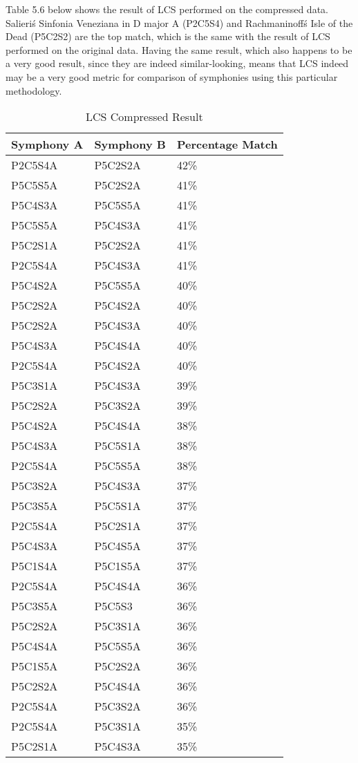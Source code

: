 Table 5.6 below shows the result of LCS performed on the compressed data.  Salieri\'s Sinfonia Veneziana in D major A (P2C5S4) and Rachmaninoff\'s Isle of the Dead (P5C2S2) are the top match, which is the same with the result of LCS performed on the original data. Having the same result, which also happens to be a very good result, since they are indeed similar-looking, means that LCS indeed may be a very good metric for comparison of symphonies using this particular methodology.

\begin{longtable}{|l|l|l|}
\caption{LCS  Compressed Result}
\label{my-label}\\
\hline
Symphony A & Symphony B & Percentage Match \\ \hline
\endfirsthead
%
\endhead
%
P2C5S4A & P5C2S2A & 42\% \\ \hline
P5C5S5A & P5C2S2A & 41\% \\ \hline
P5C4S3A & P5C5S5A & 41\% \\ \hline
P5C5S5A & P5C4S3A & 41\% \\ \hline
P5C2S1A & P5C2S2A & 41\% \\ \hline
P2C5S4A & P5C4S3A & 41\% \\ \hline
P5C4S2A & P5C5S5A & 40\% \\ \hline
P5C2S2A & P5C4S2A & 40\% \\ \hline
P5C2S2A & P5C4S3A & 40\% \\ \hline
P5C4S3A & P5C4S4A & 40\% \\ \hline
P2C5S4A & P5C4S2A & 40\% \\ \hline
P5C3S1A & P5C4S3A & 39\% \\ \hline
P5C2S2A & P5C3S2A & 39\% \\ \hline
P5C4S2A & P5C4S4A & 38\% \\ \hline
P5C4S3A & P5C5S1A & 38\% \\ \hline
P2C5S4A & P5C5S5A & 38\% \\ \hline
P5C3S2A & P5C4S3A & 37\% \\ \hline
P5C3S5A & P5C5S1A & 37\% \\ \hline
P2C5S4A & P5C2S1A & 37\% \\ \hline
P5C4S3A & P5C4S5A & 37\% \\ \hline
P5C1S4A & P5C1S5A & 37\% \\ \hline
P2C5S4A & P5C4S4A & 36\% \\ \hline
P5C3S5A & P5C5S3 & 36\% \\ \hline
P5C2S2A & P5C3S1A & 36\% \\ \hline
P5C4S4A & P5C5S5A & 36\% \\ \hline
P5C1S5A & P5C2S2A & 36\% \\ \hline
P5C2S2A & P5C4S4A & 36\% \\ \hline
P2C5S4A & P5C3S2A & 36\% \\ \hline
P2C5S4A & P5C3S1A & 35\% \\ \hline
P5C2S1A & P5C4S3A & 35\% \\ \hline
\end{longtable}

